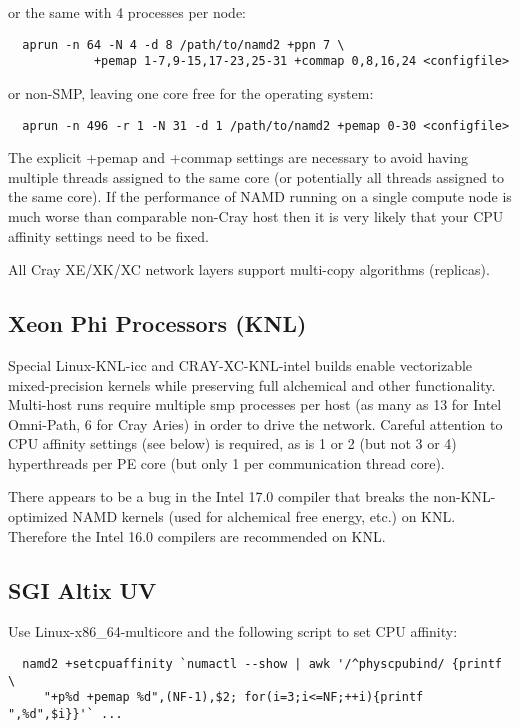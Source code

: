 or the same with 4 processes per node:

\begin{verbatim}
  aprun -n 64 -N 4 -d 8 /path/to/namd2 +ppn 7 \
            +pemap 1-7,9-15,17-23,25-31 +commap 0,8,16,24 <configfile>
\end{verbatim}

or non-SMP, leaving one core free for the operating system:

\begin{verbatim}
  aprun -n 496 -r 1 -N 31 -d 1 /path/to/namd2 +pemap 0-30 <configfile>
\end{verbatim}

The explicit +pemap and +commap settings are necessary to avoid having
multiple threads assigned to the same core (or potentially all threads
assigned to the same core).  If the performance of NAMD running on a
single compute node is much worse than comparable non-Cray host then
it is very likely that your CPU affinity settings need to be fixed.

All Cray XE/XK/XC network layers support multi-copy algorithms (replicas).

\subsection{Xeon Phi Processors (KNL)}

Special Linux-KNL-icc and CRAY-XC-KNL-intel builds enable vectorizable
mixed-precision kernels while preserving full alchemical and other
functionality.  Multi-host runs require multiple smp processes per host
(as many as 13 for Intel Omni-Path, 6 for Cray Aries) in order to drive
the network. Careful attention to CPU affinity settings (see below) is
required, as is 1 or 2 (but not 3 or 4) hyperthreads per PE core (but
only 1 per communication thread core).

There appears to be a bug in the Intel 17.0 compiler that breaks the 
non-KNL-optimized NAMD kernels (used for alchemical free energy, etc.) 
on KNL.  Therefore the Intel 16.0 compilers are recommended on KNL.

\subsection{SGI Altix UV}

Use Linux-x86\_64-multicore and the following script to set CPU affinity:

\begin{verbatim}
  namd2 +setcpuaffinity `numactl --show | awk '/^physcpubind/ {printf \
     "+p%d +pemap %d",(NF-1),$2; for(i=3;i<=NF;++i){printf ",%d",$i}}'` ...
\end{verbatim}

